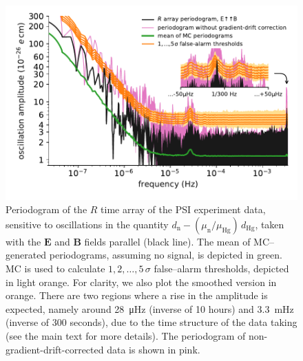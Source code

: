 \begin{figure}
  \centering
  \includegraphics[width=0.9\linewidth]{gfx/axions/detection_psi_inset_gc.pdf}
  \caption{Periodogram of the $R$ time array of the PSI experiment data, sensitive to oscillations in the quantity $d_\mathrm{n} - \left( \mu_\mathrm{n} / \mu_\mathrm{Hg} \right) \, d_\mathrm{Hg}$, taken with the $\boldsymbol{E}$ and $\boldsymbol{B}$ fields parallel (black line).
  The mean of MC--generated periodograms, assuming no signal, is depicted in green. MC is used to calculate $1,2,…,5\,\sigma$ false--alarm thresholds, depicted in light orange.
  For clarity, we also plot the smoothed version in orange.
  There are two regions where a rise in the amplitude is expected, namely around \SI{28}{\micro\hertz} (inverse of 10 hours) and \SI{3.3}{\milli\hertz} (inverse of 300 seconds), due to the time structure of the data taking (see the main text for more details). The periodogram of non-gradient-drift-corrected data is shown in pink.}
  \label{fig:axions_PSI_detection}
\end{figure}

